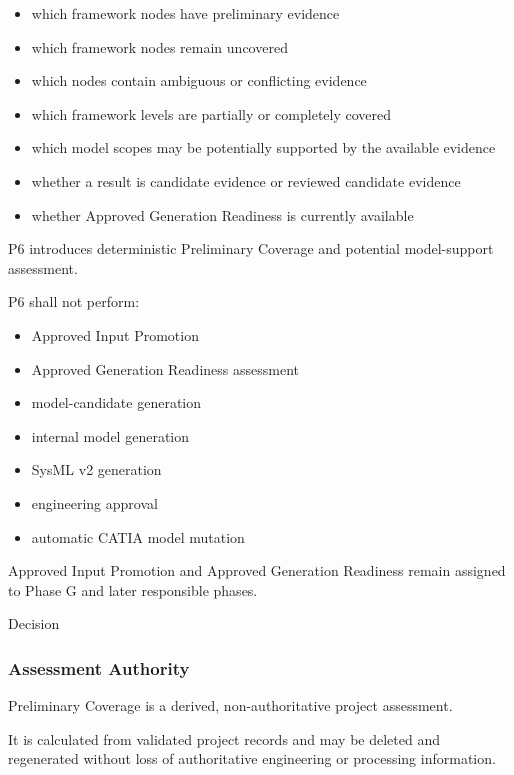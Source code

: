 \begin{itemize}
\tightlist
\item
  which framework nodes have preliminary evidence
\item
  which framework nodes remain uncovered
\item
  which nodes contain ambiguous or conflicting evidence
\item
  which framework levels are partially or completely covered
\item
  which model scopes may be potentially supported by the available evidence
\item
  whether a result is candidate evidence or reviewed candidate evidence
\item
  whether Approved Generation Readiness is currently available
\end{itemize}

P6 introduces deterministic Preliminary Coverage and potential model-support assessment.

P6 shall not perform:

\begin{itemize}
\tightlist
\item
  Approved Input Promotion
\item
  Approved Generation Readiness assessment
\item
  model-candidate generation
\item
  internal model generation
\item
  SysML v2 generation
\item
  engineering approval
\item
  automatic CATIA model mutation
\end{itemize}

Approved Input Promotion and Approved Generation Readiness remain assigned to Phase G and later responsible phases.

Decision

\hypertarget{assessment-authority}{%
\subsubsection{Assessment Authority}\label{assessment-authority}}

Preliminary Coverage is a derived, non-authoritative project assessment.

It is calculated from validated project records and may be deleted and regenerated without loss of authoritative engineering or processing information.

